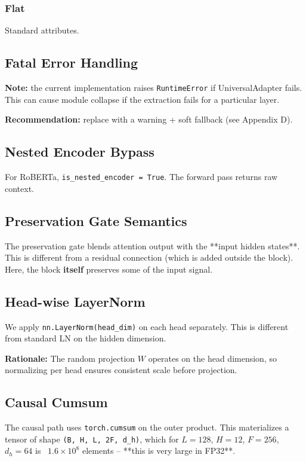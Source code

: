 \subsubsection{Flat}

Standard attributes.

\subsection{Fatal Error Handling}

\textbf{Note:} the current implementation raises \texttt{RuntimeError} if 
UniversalAdapter fails. This can cause module collapse if the extraction 
fails for a particular layer.

\textbf{Recommendation:} replace with a warning + soft fallback (see 
Appendix D).

\subsection{Nested Encoder Bypass}

For RoBERTa, \texttt{is\_nested\_encoder = True}. The forward pass returns raw 
context.

\subsection{Preservation Gate Semantics}

The preservation gate blends attention output with the **input hidden 
states**. This is different from a residual connection (which is added 
outside the block). Here, the block \textbf{itself} preserves some of the 
input signal.

\subsection{Head-wise LayerNorm}

We apply \texttt{nn.LayerNorm(head\_dim)} on each head separately. This is 
different from standard LN on the hidden dimension.

\textbf{Rationale:} The random projection $W$ operates on the head dimension, 
so normalizing per head ensures consistent scale before projection.

\subsection{Causal Cumsum}

The causal path uses \texttt{torch.cumsum} on the outer product. This materializes 
a tensor of shape \texttt{(B, H, L, 2F, d\_h)}, which for $L=128$, $H=12$, 
$F=256$, $d_h=64$ is ~$1.6 \times 10^8$ elements -- **this is very large 
in FP32**.

